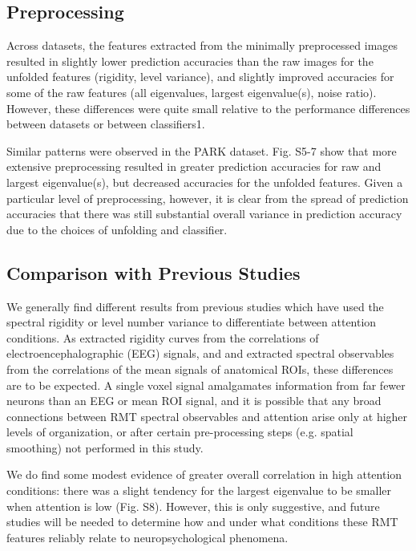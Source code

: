 \documentclass[10pt]{article}
\begin{document}
\subsection{Preprocessing}
Across datasets, the features extracted from the minimally preprocessed images resulted in slightly
lower prediction accuracies than the raw images for the unfolded features (rigidity, level
variance), and slightly improved accuracies for some of the raw features (all eigenvalues, largest
eigenvalue(s), noise ratio). However, these differences were quite small relative to the performance
differences between datasets or between classifiers1.

Similar patterns were observed in the PARK dataset. Fig. S5-7 show that more extensive preprocessing
resulted in greater prediction accuracies for raw and largest eigenvalue(s), but decreased
accuracies for the unfolded features. Given a particular level of preprocessing, however, it is
clear from the spread of prediction accuracies that there was still substantial overall variance in
prediction accuracy due to the choices of unfolding and classifier.

\subsection{Comparison with Previous Studies}

We generally find different results from previous studies
\citep{sebaRandomMatrixAnalysis2003,wangRandomMatrixTheory2016,matharooSpontaneousBackpainAlters2020}
which have used the spectral rigidity or level number variance to differentiate between attention
conditions. As \cite{sebaRandomMatrixAnalysis2003} extracted rigidity curves from the correlations
of electroencephalographic (EEG) signals, and \cite{wangRandomMatrixTheory2016} and
\cite{matharooSpontaneousBackpainAlters2020} extracted spectral observables from the correlations of
the mean signals of anatomical ROIs, these differences are to be expected. A single voxel signal
amalgamates information from far fewer neurons than an EEG or mean ROI signal, and it is possible
that any broad connections between RMT spectral observables and attention arise only at higher
levels of organization, or after certain pre-processing steps (e.g. spatial smoothing) not performed
in this study.

We do find some modest evidence of greater overall correlation in high attention conditions: there
was a slight tendency for the largest eigenvalue to be smaller when attention is low (Fig. S8).
However, this is only suggestive, and future studies will be needed to determine how and under what
conditions these RMT features reliably relate to neuropsychological phenomena.
\end{document}

